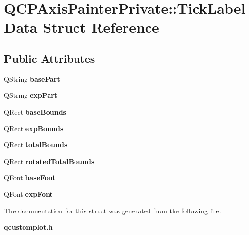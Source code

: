\section{Q\+C\+P\+Axis\+Painter\+Private\+:\+:Tick\+Label\+Data Struct Reference}
\label{struct_q_c_p_axis_painter_private_1_1_tick_label_data}
\subsection*{Public Attributes}
\begin{DoxyCompactItemize}
\item 
Q\+String {\bfseries base\+Part}\label{struct_q_c_p_axis_painter_private_1_1_tick_label_data_ad65b76a5cafc412179a20b5d79809fc4}

\item 
Q\+String {\bfseries exp\+Part}\label{struct_q_c_p_axis_painter_private_1_1_tick_label_data_a09692e4ea092137278b4ac051d5fdf2b}

\item 
Q\+Rect {\bfseries base\+Bounds}\label{struct_q_c_p_axis_painter_private_1_1_tick_label_data_aac1047ae6ab8e9f5a42923082aabfff5}

\item 
Q\+Rect {\bfseries exp\+Bounds}\label{struct_q_c_p_axis_painter_private_1_1_tick_label_data_a6722d2bcefb93011e9dc42301b966846}

\item 
Q\+Rect {\bfseries total\+Bounds}\label{struct_q_c_p_axis_painter_private_1_1_tick_label_data_afbb3163cf4c628914f1b703945419ea5}

\item 
Q\+Rect {\bfseries rotated\+Total\+Bounds}\label{struct_q_c_p_axis_painter_private_1_1_tick_label_data_aa4d38c5ea47c9184a78ee33ae7f1012e}

\item 
Q\+Font {\bfseries base\+Font}\label{struct_q_c_p_axis_painter_private_1_1_tick_label_data_a0d4958a706debaa8d19a9b65fc090d56}

\item 
Q\+Font {\bfseries exp\+Font}\label{struct_q_c_p_axis_painter_private_1_1_tick_label_data_adc10767ebcb719d6927c012a38b9d933}

\end{DoxyCompactItemize}


The documentation for this struct was generated from the following file\+:\begin{DoxyCompactItemize}
\item 
{\bf qcustomplot.\+h}\end{DoxyCompactItemize}

